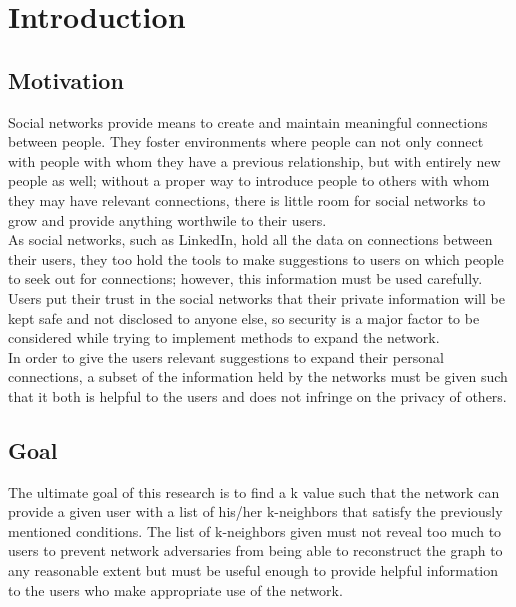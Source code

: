 \section{Introduction}

\subsection{Motivation} 


\indent Social networks provide means to create and maintain meaningful connections between people. They foster environments where people can not only connect with people with whom they have a previous relationship, but with entirely new people as well; without a proper way to introduce people to others with whom they may have relevant connections, there is little room for social networks to grow and provide anything worthwile to their users. \\

\indent As social networks, such as LinkedIn, hold all the data on connections between their users, they too hold the tools to make suggestions to users on which people to seek out for connections; however, this information must be used carefully. Users put their trust in the social networks that their private information will be kept safe and not disclosed to anyone else, so security is a major factor to be considered while trying to implement methods to expand the network.  \\

\indent In order to give the users relevant suggestions to expand their personal connections, a subset of the information held by the networks must be given such that it both is helpful to the users and does not infringe on the  privacy of others. \\

\subsection{Goal}

\indent The ultimate goal of this research is to find a k value such that the network can provide a given user with a list of his/her k-neighbors that satisfy the previously mentioned conditions. The list of k-neighbors given must not reveal too much to users to prevent network adversaries from being able to reconstruct the graph to any reasonable extent but must be useful enough to provide helpful information to the users who make appropriate use of the network. \\

